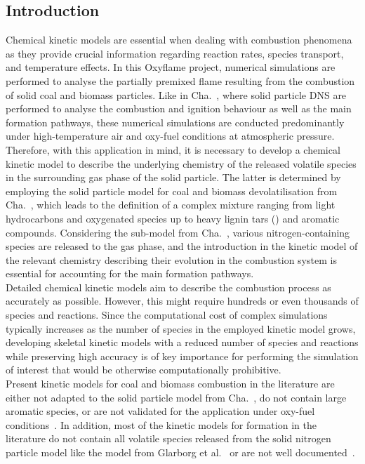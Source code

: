 \begin{refsection}
\newpage
\section{Introduction} 
Chemical kinetic models are essential when dealing with combustion phenomena as they provide crucial information regarding reaction rates, species transport, and temperature effects. In this Oxyflame project, numerical simulations are performed to analyse the partially premixed flame resulting from the combustion of solid coal and biomass particles. Like in Cha.~, where solid particle DNS are performed to analyse the combustion and ignition behaviour as well as the main  formation pathways, these numerical simulations are conducted predominantly under high-temperature air and oxy-fuel conditions at atmospheric pressure. Therefore, with this application in mind, it is necessary to develop a chemical kinetic model to describe the underlying chemistry of the released volatile species in the surrounding gas phase of the solid particle. The latter is determined by employing the solid particle model for coal and biomass devolatilisation from Cha.~, which leads to the definition of a complex mixture ranging from light hydrocarbons and oxygenated species up to heavy lignin tars () and aromatic compounds. Considering the  sub-model from Cha.~, various nitrogen-containing species are released to the gas phase, and the introduction in the kinetic model of the relevant chemistry describing their evolution in the combustion system is essential for accounting for the main  formation pathways.
\\
Detailed chemical kinetic models aim to describe the combustion process as accurately as possible. However, this might require hundreds or even thousands of species and reactions. Since the computational cost of complex simulations typically increases as the number of species in the employed kinetic model grows, developing skeletal kinetic models with a reduced number of species and reactions while preserving high accuracy is of key importance for performing the simulation of interest that would be otherwise computationally prohibitive.
\\
Present kinetic models for coal and biomass combustion in the literature are either not adapted to the solid particle model from Cha.~, do not contain large aromatic species, or are not validated for the application under oxy-fuel conditions~\cite{Shamooni2021, Goyal2017, Lovas2013}. In addition, most of the kinetic models for  formation in the literature do not contain all volatile species released from the solid nitrogen particle model like the model from Glarborg et al.~\cite{Glarborg2018} or are not well documented~\cite{Shamooni2021}. 

\end{refsection}
